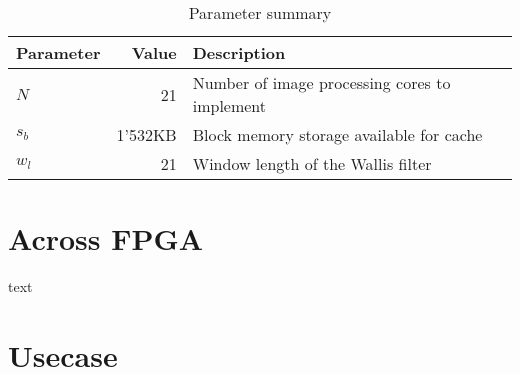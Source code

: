 \begin{table}[h!]
    \centering
    \begin{tabular}{l r l}
        \toprule
        Parameter & Value & Description\\
        \midrule
        $N$ & 21 & Number of image processing cores to implement \\
        $s_b$ & 1'532KB & Block memory storage available for cache \\
        $w_l$ & 21 & Window length of the Wallis filter \\
        \bottomrule
    \end{tabular}
    \caption{Parameter summary}
    \label{tab:parsum}
\end{table}


\section{Across FPGA}
text

\section{Usecase}

